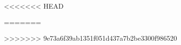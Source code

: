 \documentclass[aspectratio=169,t,13pt,usenames,dvipsnames]{beamer}
\begin{document}
<<<<<<< HEAD

=======

>>>>>>> 9e73a6f39ab1351f051d437a7b2be3300f986520
\end{document}
